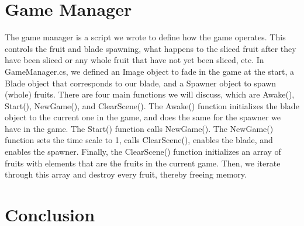 \section{Game Manager}
The game manager is a script we wrote to define how the game operates. This controls the fruit and blade spawning, what happens to the sliced fruit after they have been sliced or any whole fruit 
that have not yet been sliced, etc. In GameManager.cs, we defined an Image object to fade in the game at the start, a Blade object that corresponds to our blade, and a Spawner object to spawn (whole) 
fruits. There are four main functions we will discuss, which are Awake(), Start(), NewGame(), and ClearScene(). The Awake() function initializes the blade object to the current one in the game, and 
does the same for the spawner we have in the game. The Start() function calls NewGame(). The NewGame() function sets the time scale to 1, calls ClearScene(), enables the blade, and enables the spawner. 
Finally, the ClearScene() function initializes an array of fruits with elements that are the fruits in the current game. Then, we iterate through this array and destroy every fruit, thereby freeing memory.

\section{Conclusion}
